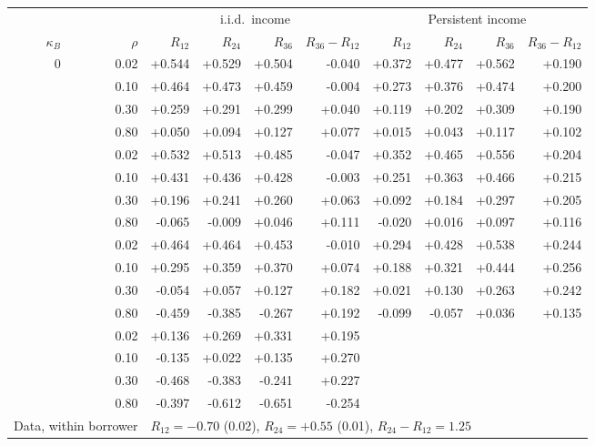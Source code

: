 \begin{tabular}{rrrrrrrrrr}
\toprule
 & & \multicolumn{4}{c}{i.i.d.\ income} & \multicolumn{4}{c}{Persistent income} \\
\cmidrule(lr){3-6} \cmidrule(lr){7-10}
$\kappa_B$ & $\rho$ & $R_{12}$ & $R_{24}$ & $R_{36}$ & $R_{36} - R_{12}$ & $R_{12}$ & $R_{24}$ & $R_{36}$ & $R_{36} - R_{12}$ \\
\midrule
0 & 0.02 & +0.544 & +0.529 & +0.504 & -0.040 & +0.372 & +0.477 & +0.562 & +0.190 \\
 & 0.10 & +0.464 & +0.473 & +0.459 & -0.004 & +0.273 & +0.376 & +0.474 & +0.200 \\
 & 0.30 & +0.259 & +0.291 & +0.299 & +0.040 & +0.119 & +0.202 & +0.309 & +0.190 \\
 & 0.80 & +0.050 & +0.094 & +0.127 & +0.077 & +0.015 & +0.043 & +0.117 & +0.102 \\
\addlinespace
0.05 & 0.02 & +0.532 & +0.513 & +0.485 & -0.047 & +0.352 & +0.465 & +0.556 & +0.204 \\
 & 0.10 & +0.431 & +0.436 & +0.428 & -0.003 & +0.251 & +0.363 & +0.466 & +0.215 \\
 & 0.30 & +0.196 & +0.241 & +0.260 & +0.063 & +0.092 & +0.184 & +0.297 & +0.205 \\
 & 0.80 & -0.065 & -0.009 & +0.046 & +0.111 & -0.020 & +0.016 & +0.097 & +0.116 \\
\addlinespace
0.2 & 0.02 & +0.464 & +0.464 & +0.453 & -0.010 & +0.294 & +0.428 & +0.538 & +0.244 \\
 & 0.10 & +0.295 & +0.359 & +0.370 & +0.074 & +0.188 & +0.321 & +0.444 & +0.256 \\
 & 0.30 & -0.054 & +0.057 & +0.127 & +0.182 & +0.021 & +0.130 & +0.263 & +0.242 \\
 & 0.80 & -0.459 & -0.385 & -0.267 & +0.192 & -0.099 & -0.057 & +0.036 & +0.135 \\
\addlinespace
0.5 & 0.02 & +0.136 & +0.269 & +0.331 & +0.195 &  &  &  &  \\
 & 0.10 & -0.135 & +0.022 & +0.135 & +0.270 &  &  &  &  \\
 & 0.30 & -0.468 & -0.383 & -0.241 & +0.227 &  &  &  &  \\
 & 0.80 & -0.397 & -0.612 & -0.651 & -0.254 &  &  &  &  \\
\midrule
\multicolumn{2}{l}{Data, within borrower} & \multicolumn{8}{l}{$R_{12} = -0.70$ (0.02), $R_{24} = +0.55$ (0.01), $R_{24} - R_{12} = 1.25$} \\
\bottomrule
\end{tabular}
